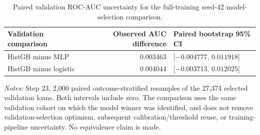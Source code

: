 \documentclass[10pt]{article}
\begin{document}
\begin{table}[!ht]
\centering
\caption{Paired validation ROC-AUC uncertainty for the full-training seed-42 model-selection comparison.}
\label{tab:supp_selection}
\begin{tabular}{lrl}
\toprule
Validation comparison & Observed AUC difference & Paired bootstrap 95\% CI \\
\midrule
HistGB minus MLP & 0.003463 & [$-0.004777$, $0.011918$] \\
HistGB minus logistic & 0.004044 & [$-0.003713$, $0.012025$] \\
\bottomrule
\end{tabular}
\par\vspace{2pt}
{\footnotesize \textit{Notes:} Step 23, 2,000 paired outcome-stratified resamples of the 27,374 selected validation loans. Both intervals include zero. The comparison uses the same validation cohort on which the model winner was identified, and does not remove validation-selection optimism, subsequent calibration/threshold reuse, or training-pipeline uncertainty. No equivalence claim is made.}
\end{table}
\end{document}
